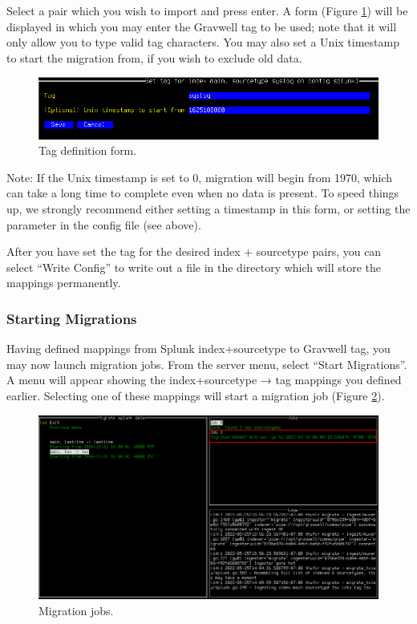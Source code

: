 Select a pair which you wish to import and press enter. A form (Figure \ref{fig:tagform}) will be displayed in which you may enter the Gravwell tag to be used; note that it will only allow you to type valid tag characters. You may also set a Unix timestamp to start the migration from, if you wish to exclude old data.

\begin{figure}
	\includegraphics[width=0.8\linewidth]{images/tagform.png}
	\caption{Tag definition form.}
	\label{fig:tagform}
\end{figure}

Note: If the Unix timestamp is set to 0, migration will begin from 1970, which can take a long time to complete even when no data is present. To speed things up, we strongly recommend either setting a timestamp in this form, or setting the  parameter in the config file (see above).

After you have set the tag for the desired index + sourcetype pairs, you can select ``Write Config'' to write out a file in the  directory which will store the mappings permanently.

\subsubsection{Starting Migrations}

Having defined mappings from Splunk index+sourcetype to Gravwell tag, you may now launch migration jobs. From the server menu, select ``Start Migrations''. A menu will appear showing the index+sourcetype → tag mappings you defined earlier. Selecting one of these mappings will start a migration job (Figure \ref{fig:migratejobs}).

\begin{figure}
	\includegraphics[width=0.95\linewidth]{images/migratejobs.png}
	\caption{Migration jobs.}
	\label{fig:migratejobs}
\end{figure}


